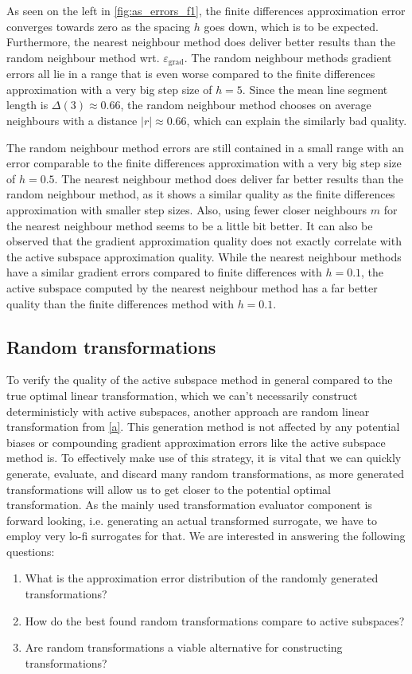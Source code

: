 \documentclass[
  a4paper,  %
  twoside,  %
  bibliography=totoc,
  headsepline,
  cleardoublepage=empty,
  parskip=half,
  draft=false
]{scrbook}
\begin{document}
As seen on the left in \cref{fig:as_errors_f1}, the finite differences approximation error converges towards zero as the spacing $h$ goes down, which is to be expected.
Furthermore, the nearest neighbour method does deliver better results than the random neighbour method wrt. $\varepsilon_{\text{grad}}$.
The random neighbour methods gradient errors all lie in a range that is even worse compared to the finite differences approximation with a very big step size of $h=5$.
Since the mean line segment length is $\Delta(3) \approx 0.66$, the random neighbour method chooses on average neighbours with a distance $|r| \approx 0.66$, which can explain the similarly bad quality.


The random neighbour method errors are still contained in a small range with an error comparable to the finite differences approximation with a very big step size of $h=0.5$.
The nearest neighbour method does deliver far better results than the random neighbour method, as it shows a similar quality as the finite differences approximation with smaller step sizes.
Also, using fewer closer neighbours $m$ for the nearest neighbour method seems to be a little bit better.
It can also be observed that the gradient approximation quality does not exactly correlate with the active subspace approximation quality.
While the nearest neighbour methods have a similar gradient errors compared to finite differences with $h=0.1$, the active subspace computed by the nearest neighbour method has a far better quality than the finite differences method with $h=0.1$.

\subsection{Random transformations}

To verify the quality of the active subspace method in general compared to the true optimal linear transformation, which we can't necessarily construct deterministicly with active subspaces, another approach are random linear transformation from \cref{a}.
This generation method is not affected by any potential biases or compounding gradient approximation errors like the active subspace method is.
To effectively make use of this strategy, it is vital that we can quickly generate, evaluate, and discard many random transformations, as more generated transformations will allow us to get closer to the potential optimal transformation.
As the mainly used transformation evaluator component is forward looking, i.e. generating an actual transformed surrogate, we have to employ very lo-fi surrogates for that.
We are interested in answering the following questions:
\begin{enumerate}
\item What is the approximation error distribution of the randomly generated transformations?
\item How do the best found random transformations compare to active subspaces?
\item Are random transformations a viable alternative for constructing transformations?
\end{enumerate}
\end{document}
